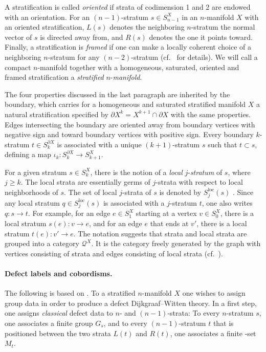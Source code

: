 \documentclass[pdftex]{sigma}
\numberwithin{equation}{section}
\theoremstyle{definition}
\begin{document}
A stratification is called \textit{oriented} if strata of codimension 1 and 2 are endowed with an orientation. For an $(n-1)$-stratum $s \in S_{n-1}^X$ in an $n$-manifold $X$ with an oriented stratification, $L(s)$ denotes the neighboring $n$-stratum the normal vector of $s$ is directed away from, and $R(s)$ denotes the one it points toward.
Finally, a stratification is \textit{framed} if one can make a locally coherent choice of a neighboring $n$-stratum for any $(n-2)$-stratum (cf.\ \cite[Definition~3.10]{FMM} for details). We will call a compact $n$-manifold together with a homogeneous, saturated, oriented and framed stratification a \textit{stratified} $n$-\textit{manifold}.

The four properties discussed in the last paragraph are inherited by the boundary, which carries for a homogeneous and saturated stratified manifold $X$ a natural stratification specified by $\partial X^k = X^{k+1} \cap \partial X$ with the same properties. Edges intersecting the boundary are oriented away from boundary vertices with negative sign and toward boundary vertices with positive sign. Every boundary $k$-stratum $t \in S_k^{\partial X}$ is associated with a unique $(k+1)$-stratum $s$ such that $t \subset s$, defining a map $\iota_k\colon S_k^{\partial X} \rightarrow S_{k+1}^X$.

For a given stratum $s \in S_k^X$, there is the notion of a \textit{local} $j$-\textit{stratum} of $s$, where $j \geq k$. The local strata are essentially germs of $j$-strata with respect to local neighborhoods of $s$. The set of local $j$-strata of $s$ is denoted by $S_j^{\mathrm{loc}}(s)$ \cite[Definition 3.13]{FMM}. Since any local stratum $q \in S_j^{\mathrm{loc}}(s)$ is associated with a $j$-stratum $t$, one also writes $q\colon s \rightarrow t$. For example, for an edge $e \in S_1^X$ starting at a vertex $v \in S_0^X$, there is a local stratum $s(e)\colon v \rightarrow e$, and for an edge $e$ that ends at $v'$, there is a local stratum $t(e)\colon v' \rightarrow e$. The notation suggests that strata and local strata are grouped into a category $\mathcal{Q}^X$. It is the category freely generated by the graph with vertices consisting of strata and edges consisting of local strata (cf.\ \cite[Definition~3.22]{FMM}).

\paragraph{Defect labels and cobordisms.} The following is based on \cite[Section~4]{FMM}. To a stratified $n$-manifold $X$ one wishes to assign group data in order to produce a defect Dijkgraaf--Witten theory. In a first step, one assigns \textit{classical} defect data to $n$- and $(n-1)$-strata: To every $n$-stratum $s$, one associates a finite group $G_s$, and to every $(n-1)$-stratum $t$ that is positioned between the two strata $L(t)$ and $R(t)$, one associates a finite -set $M_t$.
\end{document}
